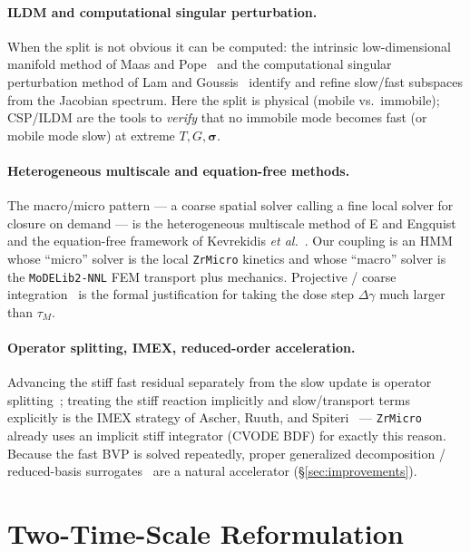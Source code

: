 \documentclass[11pt]{article}
\newcommand{\sig}{\bm{\sigma}}
\newcommand{\dg}{\Delta \gamma}
\newcommand{\ZrMicro}{\texttt{ZrMicro}}
\newcommand{\MoDELib}{\texttt{MoDELib2-NNL}}
\begin{document}
\paragraph{ILDM and computational singular perturbation.}
When the split is not obvious it can be computed: the intrinsic low-dimensional
manifold method of Maas and Pope~\cite{MaasPope1992} and the computational
singular perturbation method of Lam and Goussis~\cite{LamGoussis1994} identify
and refine slow/fast subspaces from the Jacobian spectrum. Here the split is
physical (mobile vs.\ immobile); CSP/ILDM are the tools to \emph{verify} that no
immobile mode becomes fast (or mobile mode slow) at extreme $T,G,\sig$.

\paragraph{Heterogeneous multiscale and equation-free methods.}
The macro/micro pattern --- a coarse spatial solver calling a fine local solver for
closure on demand --- is the heterogeneous multiscale method of E and
Engquist~\cite{EEngquist2003} and the equation-free framework of Kevrekidis
\emph{et al.}~\cite{Kevrekidis2003}. Our coupling is an HMM whose ``micro'' solver
is the local \ZrMicro{} kinetics and whose ``macro'' solver is the \MoDELib{} FEM
transport plus mechanics. Projective / coarse integration~\cite{GearKevrekidis2003}
is the formal justification for taking the dose step $\dg$ much larger than
$\tau_M$.

\paragraph{Operator splitting, IMEX, reduced-order acceleration.}
Advancing the stiff fast residual separately from the slow update is operator
splitting~\cite{Strang1968}; treating the stiff reaction implicitly and
slow/transport terms explicitly is the IMEX strategy of Ascher, Ruuth, and
Spiteri~\cite{AscherRuuthSpiteri1997} --- \ZrMicro{} already uses an implicit stiff
integrator (CVODE BDF) for exactly this reason. Because the fast BVP is solved
repeatedly, proper generalized decomposition / reduced-basis
surrogates~\cite{Chinesta2011} are a natural accelerator (\S\ref{sec:improvements}).

\section{Two-Time-Scale Reformulation}
\label{sec:tts}
\end{document}
